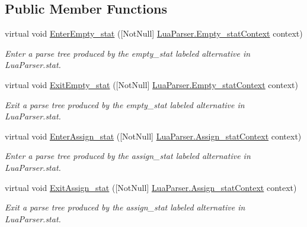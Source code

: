 \subsection*{Public Member Functions}
\begin{DoxyCompactItemize}
\item 
virtual void \mbox{\hyperlink{classzlua_1_1_lua_base_listener_a5521468da5fe9ed0eb95ada9c64c801f}{Enter\+Empty\+\_\+stat}} (\mbox{[}Not\+Null\mbox{]} \mbox{\hyperlink{classzlua_1_1_lua_parser_1_1_empty__stat_context}{Lua\+Parser.\+Empty\+\_\+stat\+Context}} context)
\begin{DoxyCompactList}\small\item\em Enter a parse tree produced by the {\ttfamily empty\+\_\+stat} labeled alternative in Lua\+Parser.\+stat. \end{DoxyCompactList}\item 
virtual void \mbox{\hyperlink{classzlua_1_1_lua_base_listener_aa5d977c15c8fc410aa01cbff4372b873}{Exit\+Empty\+\_\+stat}} (\mbox{[}Not\+Null\mbox{]} \mbox{\hyperlink{classzlua_1_1_lua_parser_1_1_empty__stat_context}{Lua\+Parser.\+Empty\+\_\+stat\+Context}} context)
\begin{DoxyCompactList}\small\item\em Exit a parse tree produced by the {\ttfamily empty\+\_\+stat} labeled alternative in Lua\+Parser.\+stat. \end{DoxyCompactList}\item 
virtual void \mbox{\hyperlink{classzlua_1_1_lua_base_listener_aec93807e61e1511e344e419191e80d43}{Enter\+Assign\+\_\+stat}} (\mbox{[}Not\+Null\mbox{]} \mbox{\hyperlink{classzlua_1_1_lua_parser_1_1_assign__stat_context}{Lua\+Parser.\+Assign\+\_\+stat\+Context}} context)
\begin{DoxyCompactList}\small\item\em Enter a parse tree produced by the {\ttfamily assign\+\_\+stat} labeled alternative in Lua\+Parser.\+stat. \end{DoxyCompactList}\item 
virtual void \mbox{\hyperlink{classzlua_1_1_lua_base_listener_a84ee6c5b5c661dee72a99902d27ee46e}{Exit\+Assign\+\_\+stat}} (\mbox{[}Not\+Null\mbox{]} \mbox{\hyperlink{classzlua_1_1_lua_parser_1_1_assign__stat_context}{Lua\+Parser.\+Assign\+\_\+stat\+Context}} context)
\begin{DoxyCompactList}\small\item\em Exit a parse tree produced by the {\ttfamily assign\+\_\+stat} labeled alternative in Lua\+Parser.\+stat. \end{DoxyCompactList}\item 

\end{DoxyCompactItemize}
